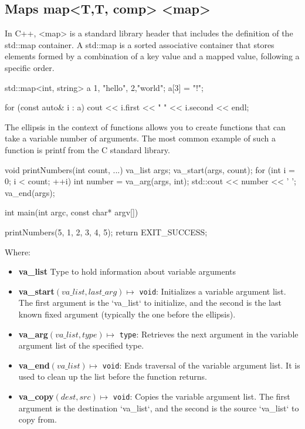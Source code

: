 \documentclass{report}
\begin{document}
\begin{concept}
    \subsection{Maps map<T,T, comp> <map>}
    \bigbreak \noindent 
    \begin{concept}
    In C++, <map> is a standard library header that includes the definition of the std::map container. A std::map is a sorted associative container that stores elements formed by a combination of a key value and a mapped value, following a specific order. 
    \bigbreak \noindent 
    \begin{cppcode}
    std::map<int, string> a {{1, "hello"}, {2,"world"}};
    a[3] = "!";

    for (const auto& i : a) {
        cout << i.first << " " << i.second << endl;
    }
    \end{cppcode}
    \end{concept}
    \bigbreak \noindent 

    \pagebreak
    \bigbreak \noindent 
    \begin{concept}
        The ellipsis in the context of functions allows you to create functions that can take a variable number of arguments. The most common example of such a function is printf from the C standard library. 
        \bigbreak \noindent 
        \begin{cppcode}
void printNumbers(int count, ...) {
    va_list args;
    va_start(args, count);
    for (int i = 0; i < count; ++i) {
        int number = va_arg(args, int);
        std::cout << number << ' ';
    }
    va_end(args);
}

int main(int argc, const char* argv[]) {

    printNumbers(5, 1, 2, 3, 4, 5);
    return EXIT_SUCCESS;
}
        \end{cppcode}
    \end{concept}
    \bigbreak \noindent 
    Where:
    \begin{itemize}
        \item \textbf{va\_list} Type to hold information about variable arguments 
        \item \textbf{va\_start}\((va\_list, last\_arg) \mapsto\) \texttt{void}: Initializes a variable argument list. The first argument is the `va\_list` to initialize, and the second is the last known fixed argument (typically the one before the ellipsis).
        \item \textbf{va\_arg}\((va\_list, type) \mapsto\) \texttt{type}: Retrieves the next argument in the variable argument list of the specified type.
        \item \textbf{va\_end}\((va\_list) \mapsto\) \texttt{void}: Ends traversal of the variable argument list. It is used to clean up the list before the function returns.
        \item \textbf{va\_copy}\((dest, src) \mapsto\) \texttt{void}: Copies the variable argument list. The first argument is the destination `va\_list`, and the second is the source `va\_list` to copy from.
    \end{itemize}


\end{concept}
\end{document}
